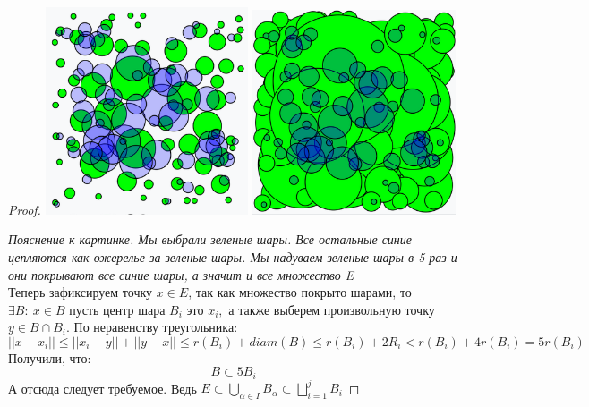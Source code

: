 \begin{proof}
    \begin{minipage}{\textwidth}
    \flushleft
    \includegraphics[width=0.45\textwidth]{images/Screenshot_3.png} 
    \flushright
    \vspace{-250pt}
    \includegraphics[width=0.45\textwidth]{images/Screenshot_4.png}
    \vspace{10pt}
    \end{minipage}
    \textit{Пояснение к картинке. Мы выбрали зеленые шары. Все остальные синие цепляются как ожерелье за зеленые шары. Мы надуваем зеленые шары в 5 раз и они покрывают все синие шары, а значит и все множество  E} \\
    Теперь зафиксируем точку $x \in E$, так как множество покрыто шарами, то $\exists B: \ x \in B$ пусть центр шара $B_i$ это $x_i,$ а также выберем произвольную точку $y \in B \cap B_i.$ По неравенству треугольника:
    $$||x - x_i|| \leq ||x_i - y|| + ||y - x|| \leq r(B_i) + diam(B) \leq r(B_i) + 2R_i < r(B_i) + 4r(B_i) = 5r(B_i)$$
    Получили, что:
    $$B \subset 5B_i$$
    А отсюда следует требуемое. Ведь $E \subset  \bigcup\limits_{\alpha \in I}B_{\alpha} \subset \bigsqcup\limits_{i = 1}^{j} B_i$


\end{proof}
